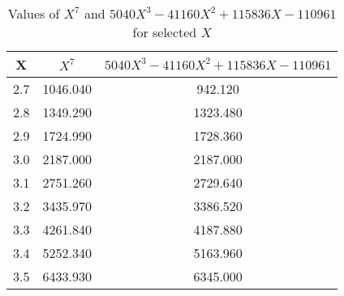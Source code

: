 ﻿%
\begin{table}[h!]
    \centering
    \caption{Values of $X^7$ and $5040X^3 - 41160X^2 + 115836X - 110961$ for selected $X$}
    \begin{tabular}{|c|c|c|}
        \hline
        \textbf{X} & \textbf{$X^7$} & \textbf{$5040X^3 - 41160X^2 + 115836X - 110961$} \\ \hline
        2.7        & 1046.040       & 942.120                                          \\ \hline
        2.8        & 1349.290       & 1323.480                                         \\ \hline
        2.9        & 1724.990       & 1728.360                                         \\ \hline
        3.0        & 2187.000       & 2187.000                                         \\ \hline
        3.1        & 2751.260       & 2729.640                                         \\ \hline
        3.2        & 3435.970       & 3386.520                                         \\ \hline
        3.3        & 4261.840       & 4187.880                                         \\ \hline
        3.4        & 5252.340       & 5163.960                                         \\ \hline
        3.5        & 6433.930       & 6345.000                                         \\ \hline

\end{tabular}
\end{table}
